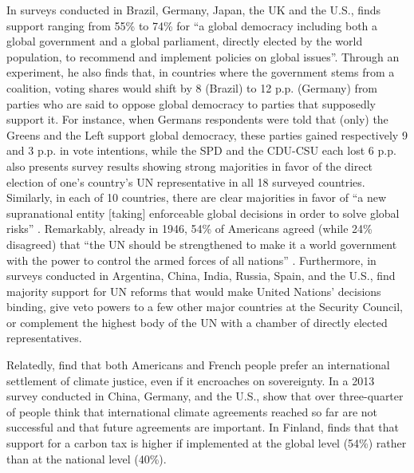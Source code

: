 In surveys conducted in Brazil, Germany, Japan, the UK and the U.S., \citet{ghassim_who_2020} finds support ranging from 55\% to 74\% for ``a global democracy including both a global government and a global parliament, directly elected by the world population, to recommend and implement policies on global issues''. %
Through an experiment, he also finds that, in countries where the government stems from a coalition, voting shares would shift by 8 (Brazil) to 12 p.p. (Germany) from parties who are said to oppose global democracy to parties that supposedly support it. For instance, when Germans respondents were told that (only) the Greens and the Left support global democracy, these parties gained respectively 9 and 3 p.p. in vote intentions, while the SPD and the CDU-CSU each lost 6 p.p. 
\citet{ghassim_who_2020} also presents survey results showing strong majorities in favor of the direct election of one's country's UN representative in all 18 surveyed countries. %
Similarly, in each of 10 countries, there are clear majorities in favor of ``a new supranational entity [taking] enforceable global decisions in order to solve global risks'' \citep{global_challenges_foundation_attitudes_2018}. Remarkably, already in 1946, 54\% of Americans agreed (while 24\% disagreed) that ``the UN should be strengthened to make it a world government with the power to control the armed forces of all nations'' \citep{gallup_seventy_1946}. 
Furthermore, in surveys conducted in Argentina, China, India, Russia, Spain, and the U.S., \citet{ghassim_public_2022} find majority support for UN reforms that would make United Nations' decisions binding, give veto powers to a few other major countries at the Security Council, or complement the highest body of the UN with a chamber of directly elected representatives. 

Relatedly, \citet{meilland_international_2023} find that both Americans and French people prefer an international settlement of climate justice, even if it encroaches on sovereignty. In a 2013 survey conducted in China, Germany, and the U.S., \citet{schleich_citizens_2016} show that over three-quarter of people think that international climate agreements reached so far are not successful and that future agreements are important. %
In Finland, \citet{sivonen_attitudes_2022} finds that that support for a carbon tax is higher if implemented at the global level (54\%) rather than at the national level (40\%).


